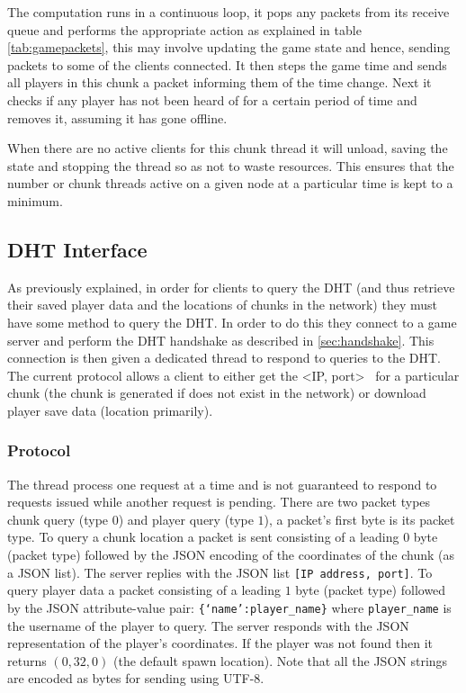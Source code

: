 \documentclass[10pt,twoside,notitlepage,a4paper]{report}
\begin{document}
	The computation runs in a continuous loop, it pops any packets from its receive queue and performs the appropriate action as explained in table \ref{tab:gamepackets}, this may involve updating the game state and hence, sending packets to some of the clients connected. It then steps the game time and sends all players in this chunk a packet informing them of the time change. Next it checks if any player has not been heard of for a certain period of time and removes it, assuming it has gone offline.
	
	When there are no active clients for this chunk thread it will unload, saving the state and stopping the thread so as not to waste resources. This ensures that the number or chunk threads active on a given node at a particular time is kept to a minimum.
	
	\subsection{DHT Interface}
	\label{sec:interface}
	As previously explained, in order for clients to query the DHT (and thus retrieve their saved player data and the locations of chunks in the network) they must have some method to query the DHT. In order to do this they connect to a game server and perform the DHT handshake as described in \cref{sec:handshake}. This connection is then given a dedicated thread to respond to queries to the DHT. The current protocol allows a client to either get the \textless IP, port\textgreater~ for a particular chunk (the chunk is generated if does not exist in the network) or download player save data (location primarily).
	
	\subsubsection{Protocol}
	The thread process one request at a time and is not guaranteed to respond to requests issued while another request is pending. There are two packet types chunk query (type $0$) and player query (type $1$), a packet's first byte is its packet type. To query a chunk location a packet is sent consisting of a leading $0$ byte (packet type) followed by the JSON encoding of the coordinates of the chunk (as a JSON list). The server replies with the JSON list \texttt{[IP address, port]}. To query player data a packet consisting of a leading $1$ byte (packet type) followed by the JSON attribute-value pair: \texttt{\{`name':player\_name\}} where \texttt{player\_name} is the username of the player to query. The server responds with the JSON representation of the player's coordinates. If the player was not found then it returns $(0,32,0)$ (the default spawn location). Note that all the JSON strings are encoded as bytes for sending using UTF-8.
	
\end{document}

